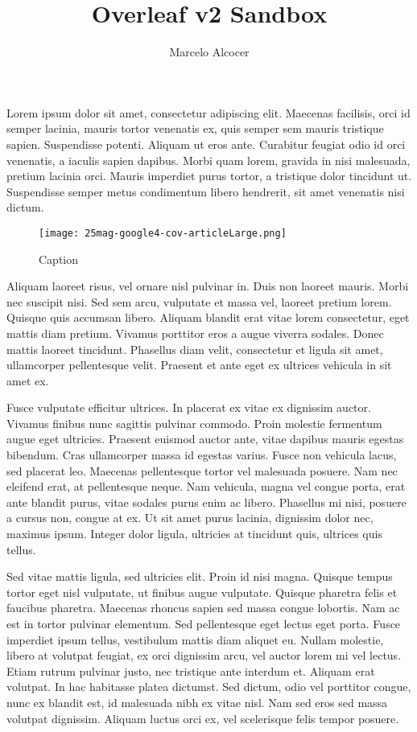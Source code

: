 \documentclass{article}
\title{Overleaf v2 Sandbox}
\author{Marcelo Alcocer}
\begin{document}
\immediate{}

\maketitle

Lorem ipsum dolor sit amet, consectetur adipiscing elit. Maecenas facilisis, orci id semper lacinia, mauris tortor venenatis ex, quis semper sem mauris tristique sapien. Suspendisse potenti. Aliquam ut eros ante. Curabitur feugiat odio id orci venenatis, a iaculis sapien dapibus. Morbi quam lorem, gravida in nisi malesuada, pretium lacinia orci. Mauris imperdiet purus tortor, a tristique dolor tincidunt ut. Suspendisse semper metus condimentum libero hendrerit, sit amet venenatis nisi dictum.


\begin{figure}
    \centering
    \texttt{[image: 25mag-google4-cov-articleLarge.png]}
    \caption{Caption}
    \label{fig:my_label}
\end{figure}

Aliquam laoreet risus, vel ornare nisl pulvinar in. Duis non laoreet mauris. Morbi nec suscipit nisi. Sed sem arcu, vulputate et massa vel, laoreet pretium lorem. Quisque quis accumsan libero. Aliquam blandit erat vitae lorem consectetur, eget mattis diam pretium. Vivamus porttitor eros a augue viverra sodales. Donec mattis laoreet tincidunt. Phasellus diam velit, consectetur et ligula sit amet, ullamcorper pellentesque velit. Praesent et ante eget ex ultrices vehicula in sit amet ex.

Fusce vulputate efficitur ultrices. In placerat ex vitae ex dignissim auctor. Vivamus finibus nunc sagittis pulvinar commodo. Proin molestie fermentum augue eget ultricies. Praesent euismod auctor ante, vitae dapibus mauris egestas bibendum. Cras ullamcorper massa id egestas varius. Fusce non vehicula lacus, sed placerat leo. Maecenas pellentesque tortor vel malesuada posuere. Nam nec eleifend erat, at pellentesque neque. Nam vehicula, magna vel congue porta, erat ante blandit purus, vitae sodales purus enim ac libero. Phasellus mi nisi, posuere a cursus non, congue at ex. Ut sit amet purus lacinia, dignissim dolor nec, maximus ipsum. Integer dolor ligula, ultricies at tincidunt quis, ultrices quis tellus.

Sed vitae mattis ligula, sed ultricies elit. Proin id nisi magna. Quisque tempus tortor eget nisl vulputate, ut finibus augue vulputate. Quisque pharetra felis et faucibus pharetra. Maecenas rhoncus sapien sed massa congue lobortis. Nam ac est in tortor pulvinar elementum. Sed pellentesque eget lectus eget porta. Fusce imperdiet ipsum tellus, vestibulum mattis diam aliquet eu. Nullam molestie, libero at volutpat feugiat, ex orci dignissim arcu, vel auctor lorem mi vel lectus. Etiam rutrum pulvinar justo, nec tristique ante interdum et. Aliquam erat volutpat. In hac habitasse platea dictumst. Sed dictum, odio vel porttitor congue, nunc ex blandit est, id malesuada nibh ex vitae nisl. Nam sed eros sed massa volutpat dignissim. Aliquam luctus orci ex, vel scelerisque felis tempor posuere.
\end{document}
